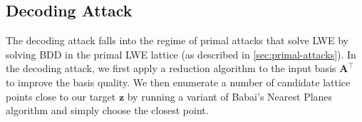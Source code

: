 










\subsection[Decoding Attack]{Decoding Attack \cite{LP11}} \label{sec:decoding}

The decoding attack falls into the regime of primal attacks that solve LWE by solving BDD in the primal LWE lattice (as described in \cref{sec:primal-attacks}). In the decoding attack, we first apply a reduction algorithm to the input basis $\mathbf{A}^\intercal$ to improve the basis quality. We then enumerate a number of candidate lattice points close to our target $\mathbf{z}$ by running a variant of Babai's Nearest Planes algorithm and simply choose the closest point. %




